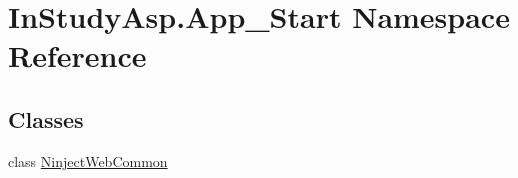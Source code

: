 \hypertarget{namespace_in_study_asp_1_1_app___start}{}\section{In\+Study\+Asp.\+App\+\_\+\+Start Namespace Reference}
\label{namespace_in_study_asp_1_1_app___start}
\subsection*{Classes}
\begin{DoxyCompactItemize}
\item 
class \hyperlink{class_in_study_asp_1_1_app___start_1_1_ninject_web_common}{Ninject\+Web\+Common}
\end{DoxyCompactItemize}
